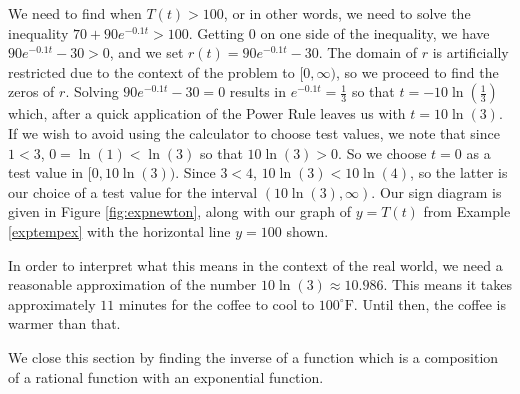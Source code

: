 {We need to find when $T(t) > 100$, or in other words, we need to solve the inequality  $70 + 90 e^{-0.1 t} > 100$.  Getting $0$ on one side of the inequality, we have  $90 e^{-0.1 t} - 30 > 0$, and we set $r(t) = 90 e^{-0.1 t} - 30$.  The domain of $r$ is artificially restricted due to the context of the problem to   $[0, \infty)$, so we proceed to find the zeros of $r$.  Solving $90 e^{-0.1 t} - 30=0$ results in $e^{-0.1t} = \frac{1}{3}$ so that $t = -10\ln\left(\frac{1}{3}\right)$ which, after a quick application of the Power Rule leaves us with $t = 10 \ln(3)$.  If we wish to avoid using the calculator to choose test values, we note that since $1 < 3$, $0 = \ln(1) < \ln(3)$ so that $10\ln(3) > 0$.  So we choose $t = 0$ as a test value in $[0, 10 \ln(3))$.  Since $3 < 4$, $10 \ln(3) < 10 \ln(4)$, so the latter is our choice of a test value for the interval $(10 \ln(3), \infty)$.  Our sign diagram is given in Figure \ref{fig:expnewton}, along with our graph of $y=T(t)$ from Example  \ref{exptempex} with the horizontal line $y = 100$ shown.   


In order to interpret what this means in the context of the real world, we need a reasonable approximation of the number $10 \ln(3) \approx 10.986$.  This means it takes approximately $11$ minutes for the coffee to cool to $100^{\circ}\mbox{F}$.  Until then, the coffee is warmer than that.
}

\medskip

We close this section by finding the inverse of a function which is a composition of a rational function with an exponential function.

\pagebreak

